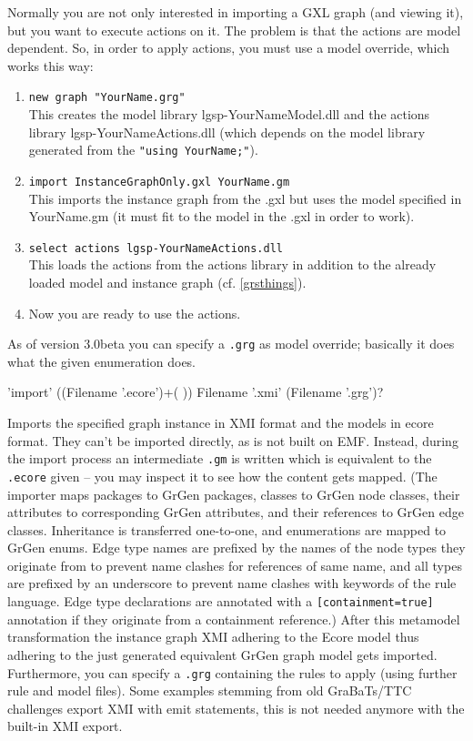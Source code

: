 \begin{note}\label{shellgxlimport}
Normally you are not only interested in importing a GXL graph (and viewing it), but you want to execute actions on it.
The problem is that the actions are model dependent.
So, in order to apply actions, you must use a model override, which works this way:
\begin{enumerate}
\item \texttt{new graph "YourName.grg"}\\
This creates the model library lgsp-YourNameModel.dll
and the actions library lgsp-YourNameActions.dll
(which depends on the model library generated from the \texttt{"using YourName;"}).
\item \texttt{import InstanceGraphOnly.gxl YourName.gm}\\
This imports the instance graph from the .gxl but uses the model specified
in YourName.gm (it must fit to the model in the .gxl in order to work).
\item \texttt{select actions lgsp-YourNameActions.dll}\\
This loads the actions from the actions library in addition to the already
loaded model and instance graph (cf. \ref{grsthings}).
\item Now you are ready to use the actions.
\end{enumerate}
As of version 3.0beta you can specify a \texttt{.grg} as model override;
basically it does what the given enumeration does.
\end{note}

\begin{rail}
  'import' ((Filename '.ecore')+( )) Filename '.xmi' (Filename '.grg')?
\end{rail}\label{shellecoreexport}
Imports the specified graph instance in XMI format and the models in ecore format.
They can't be imported directly, as \GrG{ } is not built on EMF.
Instead, during the import process an intermediate \texttt{.gm} is written which is equivalent to the \texttt{.ecore} given -- you may inspect it to see how the content gets mapped.
(The importer maps packages to GrGen packages, classes to GrGen node classes, their attributes to corresponding GrGen attributes, and their references to GrGen edge classes.
Inheritance is transferred one-to-one, and enumerations are mapped to GrGen enums.
Edge type names are prefixed by the names of the node types they originate from to prevent name clashes for references of same name,
and all types are prefixed by an underscore to prevent name clashes with keywords of the rule language.
Edge type declarations are annotated with a \verb#[containment=true]# annotation if they originate from a containment reference.)
After this metamodel transformation the instance graph XMI adhering to the Ecore model thus adhering to the just
generated equivalent GrGen graph model gets imported.
Furthermore, you can specify a \texttt{.grg} containing the rules to apply (using further rule and model files).
Some examples stemming from old GraBaTs/TTC challenges export XMI with emit statements, this is not needed anymore with the built-in XMI export.

